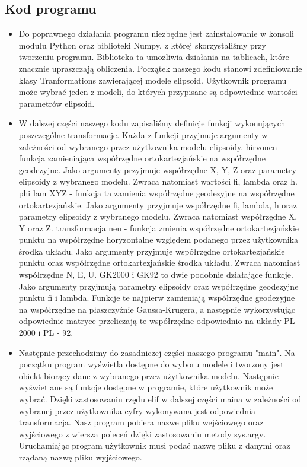\documentclass[10pt,a4paper]{article}
\begin{document}
\subsection{Kod programu}
\begin{itemize}
	\item Do poprawnego działania programu niezbędne jest zainstalowanie w konsoli modułu Python oraz biblioteki Numpy, z której skorzystaliśmy przy tworzeniu programu. Biblioteka ta umożliwia działania na tablicach, które znacznie upraszczają obliczenia. Początek naszego kodu stanowi zdefiniowanie klasy Tranformations zawierającej modele elipsoid. Użytkownik programu może wybrać jeden z modeli, do których przypisane są odpowiednie wartości parametrów elipsoid.
	\item W dalszej części naszego kodu zapisaliśmy definicje funkcji wykonujących poszczególne transformacje. Każda z funkcji przyjmuje argumenty w zależności od wybranego przez użytkownika modelu elipsoidy. \newline
	hirvonen - funkcja zamieniająca współrzędne ortokartezjańskie na współrzędne geodezyjne. Jako argumenty przyjmuje współrzędne X, Y, Z oraz parametry elipsoidy z wybranego modelu. Zwraca natomiast wartości fi, lambda oraz h.\newline
	phi lam XYZ - funkcja ta zamienia współrzędne geodezyjne na współrzędne ortokartezjańskie. Jako argumenty przyjmuje współrzędne fi, lambda, h oraz parametry elipsoidy z wybranego modelu. Zwraca natomiast współrzędne X, Y oraz Z.\newline
	transformacja neu - funkcja zmienia współrzędne ortokartezjańskie punktu na współrzędne horyzontalne względem podanego przez użytkownika środka układu. Jako argumenty przyjmuje współrzędne ortokartezjańskie punktu oraz współrzędne ortokartezjańskie środka układu. Zwraca natomiast współrzędne N, E, U.\newline
	GK2000 i GK92 to dwie podobnie działające funkcje. Jako argumenty przyjmują parametry elipsoidy oraz współrzędne geodezyjne punktu fi i lambda. Funkcje te najpierw zamieniają współrzędne geodezyjne na współrzędne na płaszczyźnie Gaussa-Krugera, a następnie wykorzystując odpowiednie matryce przeliczają te współrzędne odpowiednio na układy PL- 2000 i PL - 92.
	\item Następnie przechodzimy do zasadniczej części naszego programu "main". Na początku program wyświetla dostępne do wyboru modele i tworzony jest obiekt biorący dane z wybranego przez użytkownika modelu. Następnie wyświetlane są funkcje dostępne w programie, które użytkownik może wybrać. Dzięki zastosowaniu rzędu elif w dalszej części maina w zależności od wybranej przez użytkownika cyfry wykonywana jest odpowiednia transformacja. Nasz program pobiera nazwe pliku wejściowego oraz wyjściowego z wiersza poleceń dzięki zastosowaniu metody sys.argv. Uruchamiając program użytkownik musi podać nazwę pliku z danymi oraz rządaną nazwę pliku wyjściowego.\newline

\end{itemize}
\end{document}
